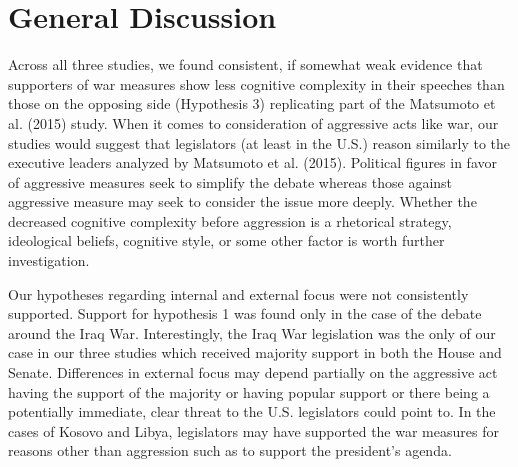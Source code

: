 \documentclass[english,,man]{apa6}
\begin{document}
\hypertarget{general-discussion}{%
\section{General Discussion}\label{general-discussion}}

Across all three studies, we found consistent, if somewhat weak evidence that supporters of war measures show less cognitive complexity in their speeches than those on the opposing side (Hypothesis 3) replicating part of the Matsumoto et al. (2015) study. When it comes to consideration of aggressive acts like war, our studies would suggest that legislators (at least in the U.S.) reason similarly to the executive leaders analyzed by Matsumoto et al. (2015). Political figures in favor of aggressive measures seek to simplify the debate whereas those against aggressive measure may seek to consider the issue more deeply. Whether the decreased cognitive complexity before aggression is a rhetorical strategy, ideological beliefs, cognitive style, or some other factor is worth further investigation.

Our hypotheses regarding internal and external focus were not consistently supported. Support for hypothesis 1 was found only in the case of the debate around the Iraq War. Interestingly, the Iraq War legislation was the only of our case in our three studies which received majority support in both the House and Senate. Differences in external focus may depend partially on the aggressive act having the support of the majority or having popular support or there being a potentially immediate, clear threat to the U.S. legislators could point to. In the cases of Kosovo and Libya, legislators may have supported the war measures for reasons other than aggression such as to support the president's agenda.
\end{document}
